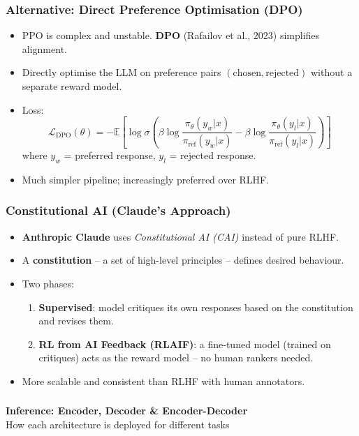 \begin{frame}[fragile]\frametitle{Alternative: Direct Preference Optimisation (DPO)}
\begin{itemize}
\item PPO is complex and unstable. \textbf{DPO} (Rafailov et al., 2023) simplifies alignment.
\item Directly optimise the LLM on preference pairs $(\text{chosen}, \text{rejected})$ without a separate reward model.
\item Loss:
\[
  \mathcal{L}_\text{DPO}(\theta) 
    = -\mathbb{E}\!\left[\log\sigma\!\left(\beta\log\frac{\pi_\theta(y_w|x)}{\pi_\text{ref}(y_w|x)} 
    - \beta\log\frac{\pi_\theta(y_l|x)}{\pi_\text{ref}(y_l|x)}\right)\right]
\]
where $y_w$ = preferred response, $y_l$ = rejected response.
\item Much simpler pipeline; increasingly preferred over RLHF.
\end{itemize}
\end{frame}

\begin{frame}[fragile]\frametitle{Constitutional AI (Claude's Approach)}
\begin{itemize}
\item \textbf{Anthropic Claude} uses \emph{Constitutional AI (CAI)} instead of pure RLHF.
\item A \textbf{constitution} – a set of high-level principles – defines desired behaviour.
\item Two phases:
  \begin{enumerate}
  \item \textbf{Supervised}: model critiques its own responses based on the constitution and revises them.
  \item \textbf{RL from AI Feedback (RLAIF)}: a fine-tuned model (trained on critiques) acts as the reward model – no human rankers needed.
  \end{enumerate}
\item More scalable and consistent than RLHF with human annotators.
\end{itemize}
\end{frame}



\begin{frame}[fragile]\frametitle{}
\begin{center}
{\Large \textbf{Inference: Encoder, Decoder \& Encoder-Decoder}}\\[0.5em]
{\normalsize How each architecture is deployed for different tasks}
\end{center}
\end{frame}


